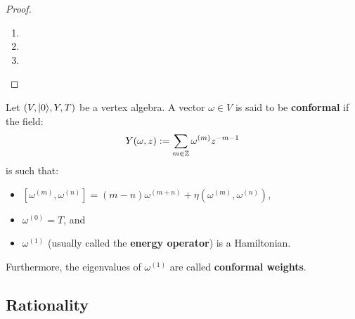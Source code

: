             \begin{proof}
                \begin{enumerate}
                    \item 
                    \item 
                    \item 
                \end{enumerate}
            \end{proof}
        
        \begin{definition} \label{def: conformal_vertex_algebras}
            Let $(V, \lvert {0} \rangle, Y, T)$ be a vertex algebra. A vector $\omega \in V$ is said to be \textbf{conformal} if the field:
                $$Y(\omega, z) := \sum_{m \in \mathbb{Z}} \omega^{(m)} z^{-m - 1}$$
            is such that:
            \begin{itemize}
                \item $[\omega^{(m)}, \omega^{(n)}] = (m - n) \omega^{(m + n)} + \eta(\omega^{(m)}, \omega^{(n)})$,
                \item $\omega^{(0)} = T$, and
                \item $\omega^{(1)}$ (usually called the \textbf{energy operator}) is a Hamiltonian.
            \end{itemize}
            Furthermore, the eigenvalues of $\omega^{(1)}$ are called \textbf{conformal weights}.
        \end{definition}

    \subsection{Rationality}